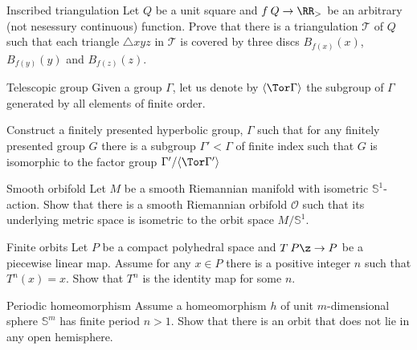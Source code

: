 \begin{pr}{}{Inscribed triangulation}
Let $Q$ be a unit square and $f\:Q\to\RR_>$ be an arbitrary (not nesessury continuous) function.
Prove that there is a triangulation $\mathcal T$ of $Q$ such that each triangle $\triangle xyz$ in $\mathcal T$ is covered by three discs $B_{f(x)}(x)$, $B_{f(y)}(y)$ and $B_{f(z)}(z)$.
\end{pr}




\begin{pr}{}{Telescopic group}
Given a group $\Gamma$, let us denote by $\langle\Tor\Gamma\rangle$ the subgroup of $\Gamma$ generated by all elements of finite order.

Construct a finitely presented hyperbolic group, $\Gamma$ such that for any finitely presented group $G$ there is a subgroup $\Gamma'<\Gamma$ of finite index such that 
$G$ is isomorphic to the factor group $\Gamma'/\langle\Tor\Gamma'\rangle$
\end{pr}



\begin{pr}{}{Smooth orbifold}\label{Smooth orbifold}
Let $M$ be a smooth Riemannian manifold with isometric 
$\mathbb{S}^1$-action.
Show that there is a smooth Riemannian orbifold $\mathcal{O}$
such that its underlying metric space 
is isometric to the orbit space $M/\mathbb{S}^1$.
\end{pr}


\begin{pr}{}{Finite orbits}\label{Finite orbits}
Let $P$ be a compact polyhedral space and $T\:P\z\to P$ be a piecewise linear map.
Assume for any $x\in P$ there is a positive integer $n$ such that
$T^n(x)=x$.
Show that $T^n$ is the identity map for some $n$. 
\end{pr}

\begin{pr}{\easy}{Periodic homeomorphism}\label{Finite action}
Assume a homeomorphism $h$ of unit $m$-dimensional sphere $\mathbb S^m$ has  finite period $n>1$.
Show that there is an orbit that does not lie in any open hemisphere.
\end{pr}
